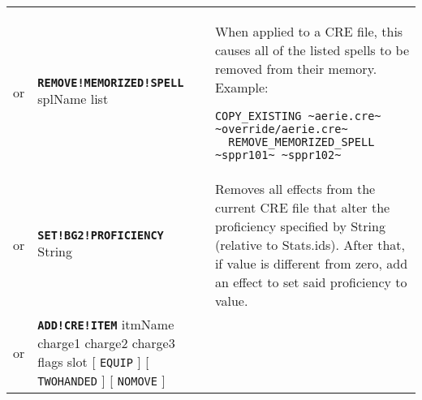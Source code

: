 \documentclass{article}
\def\ttref#1{\ahrefloc{#1}{\tt #1}}
\def\DEFINE#1{{\tt \bf #1}\label{#1}\index{#1}}
\def\DEFSYN#1{{\tt \bf #1}\index{#1}}
\def\t#1{{\tt #1}}
\def\Slist{{\color{red} list }}
\def\Ob{{\color{red} [ }}
\def\Oe{{\color{red} ] }}
\begin{document}
\begin{tabular}{cp{10in}|p{10in}}
or & \DEFINE{REMOVE!MEMORIZED!SPELL} splName \Slist &
  When applied to a CRE file, this \ttref{patch} causes all of the
  listed spells to be removed from their memory. Example:
\begin{verbatim}
COPY_EXISTING ~aerie.cre~ ~override/aerie.cre~
  REMOVE_MEMORIZED_SPELL ~sppr101~ ~sppr102~
\end{verbatim}
 \\

or & \DEFINE{SET!BG2!PROFICIENCY} String \ttref{value} &
	Removes all effects from the current CRE file that alter the proficiency specified by
	String (relative to Stats.ids). After that, if value is different from zero, add an effect
	to set said proficiency to value. \\

or & \DEFSYN{ADD!CRE!ITEM} itmName charge1 charge2 charge3 flags slot \Ob
\t{EQUIP} \Oe \Ob \t{TWOHANDED} \Oe \Ob \t{NOMOVE} \Oe &


\end{tabular}
\end{document}
